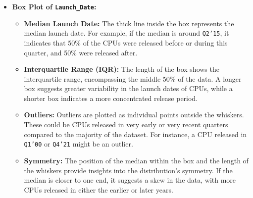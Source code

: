 \documentclass{article}
\begin{document}
\begin{itemize}
\begin{itemize}
			\item \textbf{Box Plot of \texttt{Launch\_Date}:}
			\begin{itemize}
				\item \textbf{Median Launch Date:} 
				The thick line inside the box represents the median launch date. For example, if the median is around \texttt{Q2'15}, it indicates that 50\% of the CPUs were released before or during this quarter, and 50\% were released after.
				\item \textbf{Interquartile Range (IQR):} 
				The length of the box shows the interquartile range, encompassing the middle 50\% of the data. A longer box suggests greater variability in the launch dates of CPUs, while a shorter box indicates a more concentrated release period.
				\item \textbf{Outliers:} 
				Outliers are plotted as individual points outside the whiskers. These could be CPUs released in very early or very recent quarters compared to the majority of the dataset. For instance, a CPU released in \texttt{Q1'00} or \texttt{Q4'21} might be an outlier.
				\item \textbf{Symmetry:} 
				The position of the median within the box and the length of the whiskers provide insights into the distribution's symmetry. If the median is closer to one end, it suggests a skew in the data, with more CPUs released in either the earlier or later years.
			\end{itemize}
		\end{itemize}
	\end{itemize}
	
\end{document}
